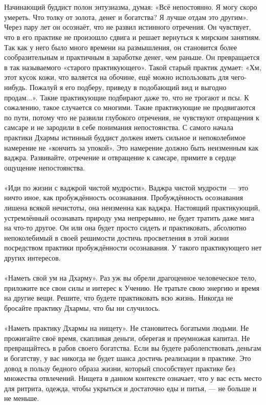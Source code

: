 \\ \\ Начинающий буддист полон энтузиазма, думая: «Всё непостоянно. Я могу скоро умереть. Что толку от золота, денег и богатства? Я лучше отдам это другим». Через пару лет он осознаёт, что не развил истинного отречения. Он чувствует, что в его практике не произошло сдвига и решает вернуться к мирским занятиям. Так как у него было много времени на размышления, он становится более сообразительным и практичным в заработке денег, чем раньше. Он превращается в так называемого «старого практикующего». Такой старый практик думает: «Хм, этот кусок кожи, что валяется на обочине, ещё можно использовать для чего-нибудь. Пожалуй я его подберу, приведу в подобающий вид и выгодно продам...». Такие практикующие подбирают даже то, что не трогают и псы. К сожалению, такое случается со многими. Такие практикующие не продвигаются по пути, потому что не развили глубокого отречения, не чувствуют отвращения к самсаре и не зародили в себе понимания непостоянства. С самого начала практики Дхармы истинный буддист должен иметь сильное и непоколебимое намерение не «кончить за упокой». Это намерение должно быть неизменным как ваджра. Развивайте, отречение и отвращение к самсаре, примите в сердце ощущение непостоянства.
\\ \\ «Иди по жизни с ваджрой чистой мудрости». Ваджра чистой мудрости — это ничто иное, как пробуждённость осознавания. Пробуждённость осознавания лишена всякой нечистоты, она неизменна как ваджра. Настоящий практикующий, устремлённый осознавать природу ума непрерывно, не будет тратить даже мига на что-то другое. Он или она будет просто сидеть и практиковать, абсолютно непоколебимый в своей решимости достичь просветления в этой жизни посредством практики пробуждённости осознавания. У такого практикующего нет других интересов.
\\ \\ «Наметь свой ум на Дхарму». Раз уж вы обрели драгоценное человеческое тело, приложите все свои силы и интерес к Учению. Не тратьте свою энергию и время на другие вещи. Решите, что будете практиковать всю жизнь. Никогда не бросайте практику Дхармы, что бы ни случилось.
\\ \\ «Наметь практику Дхармы на нищету». Не становитесь богаты\-ми людьми. Не прожигайте своё время, скапливая деньги, оберегая и преумножая капитал. Не превращайтесь в рабов своего богатства. Если вы будете раболепствовать деньгам и богатству, у вас никогда не будет шанса достичь реализации в практике. Это довод в пользу бедного образа жизни, который способствует практике без множества отвлечений. Нищета в данном контексте означает, что у вас есть место для ритрита, одежда, чтобы укрыться и достаточно еды и питья, — не больше и не меньше.
